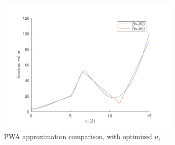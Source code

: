\begin{figure}
    \centering
    \includegraphics[width=0.8\textwidth]{Latex/images/step24.pdf}
    \caption{PWA approximation comparison, with optimized $u_i$}
    \label{fig:part24}
\end{figure}